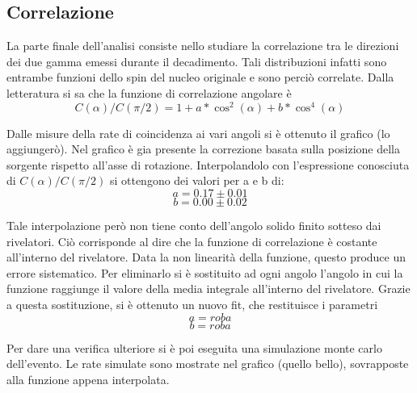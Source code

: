 \subsection{Correlazione}
La parte finale dell'analisi consiste nello studiare la correlazione tra le direzioni dei due gamma emessi durante il decadimento. Tali distribuzioni infatti sono entrambe funzioni dello spin del nucleo originale e sono perciò correlate. Dalla letteratura si sa che la funzione di correlazione angolare è 
$$ C(\alpha)/C(\pi/2) = 1+a*\cos^2(\alpha)+b*\cos^4(\alpha)$$

Dalle misure della rate di coincidenza ai vari angoli si è ottenuto il grafico (lo aggiungerò). Nel grafico è gia presente la correzione basata sulla posizione della sorgente rispetto all'asse di rotazione. Interpolandolo con l'espressione conosciuta di $C(\alpha)/C(\pi/2)$ si ottengono dei valori per a e b di:
$$a=0.17\pm 0.01$$
$$b=0.00\pm 0.02$$

Tale interpolazione però non tiene conto dell'angolo solido finito sotteso dai rivelatori. Ciò corrisponde al dire che la funzione di correlazione è costante all'interno del rivelatore. Data la non  linearità della funzione, questo produce un errore sistematico. Per eliminarlo si è sostituito ad ogni angolo l'angolo in cui la funzione raggiunge il valore della media integrale all'interno del rivelatore. Grazie a questa sostituzione, si è ottenuto un nuovo fit, che restituisce i parametri
$$a=roba$$
$$b=roba$$

Per dare una verifica ulteriore si è poi eseguita una simulazione monte carlo dell'evento. Le rate simulate sono mostrate nel grafico (quello bello), sovrapposte alla funzione appena interpolata.
